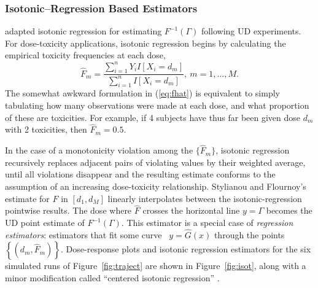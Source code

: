 \subsubsection{Isotonic--Regression Based Estimators}

\cite{Styl:Flou:dose:2002} adapted isotonic regression \citep{BBBB:order:1972} for estimating $F^{-1}(\Gamma)$ following UD experiments. For dose-toxicity applications, isotonic regression begins by calculating the empirical toxicity frequencies at each dose,
%
\begin{equation}\label{eq:fhat}
\hat{F}_m=\frac{\sum_{i=1}^n Y_iI\left[X_i=d_m\right]}{\sum_{i=1}^n I\left[X_i=d_m\right]},\ m=1,\ldots,M.
\end{equation}
%
The somewhat awkward formulation in (\ref{eq:fhat}) is equivalent to simply tabulating how many observations were made at each dose, and what proportion of these are toxicities. For example, if 4 subjects have thus far been given dose $d_m$ with 2 toxicities, then $\hat{F}_m=0.5$.

In the case of a monotonicity violation among the $\{\hat{F}_m\}$, isotonic regression recursively replaces adjacent pairs of violating values by their weighted average, until all violations disappear and the resulting estimate conforms to the assumption of an increasing dose-toxicity relationship. Stylianou and Flournoy's estimate for $F$ in $[d_1,d_M]$ linearly interpolates between the isotonic-regression pointwise results. The dose where $\hat{F}$ crosses the horizontal line $y=\Gamma$ becomes the UD point estimate of $F^{-1}(\Gamma)$. This estimator is a special case of \emph{regression estimators}: estimators that fit some curve \ $y=\hat{G}(x)$ through the points $\left\{\left(d_m,\hat{F}_m\right)\right\}$.  Dose-response plots and isotonic regression estimators for the six simulated runs of Figure~\ref{fig:traject} are shown in Figure~\ref{fig:isot}, along with a minor modification called ``centered isotonic regression'' \citep[Section~3.3]{Oron07}.

